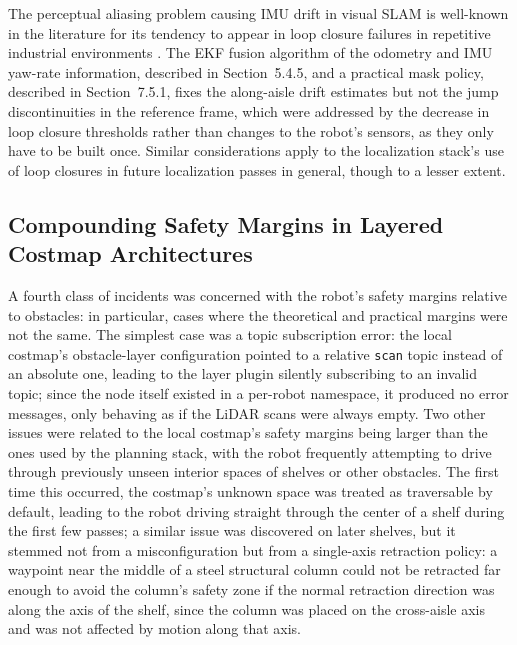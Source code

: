 The perceptual aliasing problem causing IMU drift in visual SLAM is well-known in the literature for its tendency to appear in loop closure failures in repetitive industrial environments \cite{kim2025query}. The EKF fusion algorithm of the odometry and IMU yaw-rate information, described in Section~5.4.5, and a practical mask policy, described in Section~7.5.1, fixes the along-aisle drift estimates but not the jump discontinuities in the reference frame, which were addressed by the decrease in loop closure thresholds rather than changes to the robot's sensors, as they only have to be built once. Similar considerations apply to the localization stack's use of loop closures in future localization passes in general, though to a lesser extent.

\subsection{Compounding Safety Margins in Layered Costmap Architectures}

A fourth class of incidents was concerned with the robot's safety margins relative to obstacles: in particular, cases where the theoretical and practical margins were not the same. The simplest case was a topic subscription error: the local costmap's obstacle-layer configuration pointed to a relative \texttt{scan} topic instead of an absolute one, leading to the layer plugin silently subscribing to an invalid topic; since the node itself existed in a per-robot namespace, it produced no error messages, only behaving as if the LiDAR scans were always empty. Two other issues were related to the local costmap's safety margins being larger than the ones used by the planning stack, with the robot frequently attempting to drive through previously unseen interior spaces of shelves or other obstacles. The first time this occurred, the costmap's unknown space was treated as traversable by default, leading to the robot driving straight through the center of a shelf during the first few passes; a similar issue was discovered on later shelves, but it stemmed not from a misconfiguration but from a single-axis retraction policy: a waypoint near the middle of a steel structural column could not be retracted far enough to avoid the column's safety zone if the normal retraction direction was along the axis of the shelf, since the column was placed on the cross-aisle axis and was not affected by motion along that axis.

